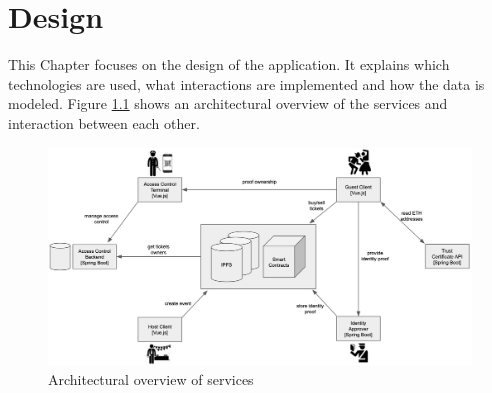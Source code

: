 \chapter{Design}\label{chapter:design}
This Chapter focuses on the design of the application. It explains which technologies are used, what interactions are implemented and how the data is modeled. Figure \ref{fig:architecutral-overview} shows an architectural overview of the services and interaction between each other. 


\begin{figure}[H]
    \centering
    \includegraphics[width=16cm]{figures/architecutal-overview.png}
    \caption{Architectural overview of services}
    \label{fig:architecutral-overview}
\end{figure}










